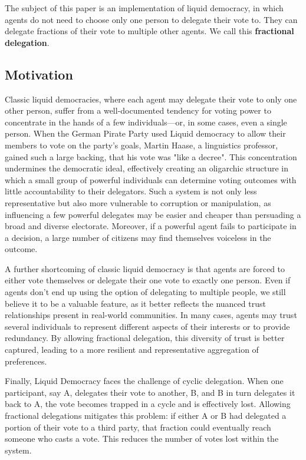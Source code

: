 The subject of this paper is an implementation of liquid democracy, in which agents do not need to choose only one person to delegate their vote to. They can delegate fractions of their vote to multiple other agents. We call this \textbf{fractional delegation}. 

\subsection{Motivation}

Classic liquid democracies, where each agent may delegate their vote to only one other person, suffer from a well-documented tendency for voting power to concentrate in the hands of a few individuals—or, in some cases, even a single person. \cite{klingVotingBehaviourPower2015, caragiannisContributionCritiqueLiquid2019, beckerWhenCanLiquid2021} When the German Pirate Party used Liquid democracy to allow their members to vote on the party's goals, Martin Haase, a linguistics professor, gained such a large backing, that his vote was "like a decree". \cite{beckerWebPlatformMakes2012} This concentration undermines the democratic ideal, effectively creating an oligarchic structure in which a small group of powerful individuals can determine voting outcomes with little accountability to their delegators. Such a system is not only less representative but also more vulnerable to corruption or manipulation, as influencing a few powerful delegates may be easier and cheaper than persuading a broad and diverse electorate. Moreover, if a powerful agent fails to participate in a decision, a large number of citizens may find themselves voiceless in the outcome.

A further shortcoming of classic liquid democracy is that agents are forced to either vote themselves or delegate their one vote to exactly one person. Even if agents don't end up using the option of delegating to multiple people, we still believe it to be a valuable feature, as it better reflects the nuanced trust relationships present in real-world communities. In many cases, agents may trust several individuals to represent different aspects of their interests or to provide redundancy. By allowing fractional delegation, this diversity of trust is better captured, leading to a more resilient and representative aggregation of preferences. 

Finally, Liquid Democracy faces the challenge of cyclic delegation. When one participant, say A, delegates their vote to another, B, and B in turn delegates it back to A, the vote becomes trapped in a cycle and is effectively lost. \cite{behrensCircularDelegationsMyth2015} Allowing fractional delegations mitigates this problem: if either A or B had delegated a portion of their vote to a third party, that fraction could eventually reach someone who casts a vote. This reduces the number of votes lost within the system.

